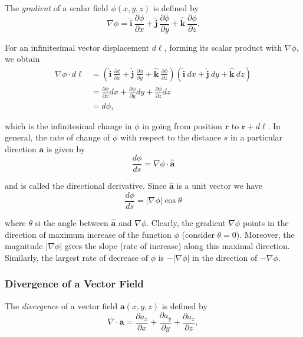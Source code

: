 \documentclass{article}
\newcommand{\ihat}{\mathbf{\hat{i}}}
\newcommand{\jhat}{\mathbf{\hat{j}}}
\newcommand{\khat}{\mathbf{\hat{k}}}
\begin{document}
The \emph{gradient} of a scalar field $\phi(x, y, z)$ is defined by
\begin{equation*}
    \nabla \phi = \ihat\ \frac{\partial \phi}{\partial x} + \jhat\ \frac{\partial \phi}{\partial y} + \khat\ \frac{\partial \phi}{\partial z}.
\end{equation*}

For an infinitesimal vector displacement $d\bm{\ell}$, forming its scalar product with $\nabla \phi$, we obtain
\begin{align*}
    \nabla \phi \cdot d\bm{\ell} &= \left( \ihat\ \frac{\partial \phi}{\partial x} + \jhat\ \frac{\partial \phi}{\partial y} + \khat\ \frac{\partial \phi}{\partial z} \right) \left( \ihat\ dx + \jhat\ dy + \khat\ dz \right) \\
    &= \frac{\partial \phi}{\partial x} dx + \frac{\partial \phi}{\partial y} dy + \frac{\partial \phi}{\partial z} dz \\
    &= d\phi,
\end{align*}

which is the infinitesimal change in $\phi$ in going from position $\bm{r}$ to $\bm{r} + d\bm{\ell}$. In general, the rate of change of $\phi$ with respect to the distance $s$ in a particular direction $\bm{a}$ is given by
\begin{equation*}
    \frac{d\phi}{ds} = \nabla \phi \cdot \hat{\bm{a}}
\end{equation*}

and is called the directional derivative. Since $\hat{\bm{a}}$ is a unit vector we have
\begin{equation*}
    \frac{d\phi}{ds} = \left| \nabla \phi \right| \cos{\theta}
\end{equation*}

where $\theta$ si the angle between $\hat{\bm{a}}$ and $\nabla \phi$. Clearly, the gradient $\nabla \phi$ points in the direction of maximum increase of the function $\phi$ (consider $\theta = 0$). Moreover, the magnitude $\left| \nabla \phi \right|$ gives the slope (rate of increase) along this maximal direction. Similarly, the largest rate of decrease of $\phi$ is $-\left| \nabla \phi \right|$ in the direction of $-\nabla \phi$.

\subsubsection{Divergence of a Vector Field}

The \emph{divergence} of a vector field $\bm{a}(x, y, z)$ is defined by
\begin{equation*}
    \nabla \cdot \bm{a} = \frac{\partial a_x}{\partial x} + \frac{\partial a_y}{\partial y} + \frac{\partial a_z}{\partial z},
\end{equation*}
\end{document}
